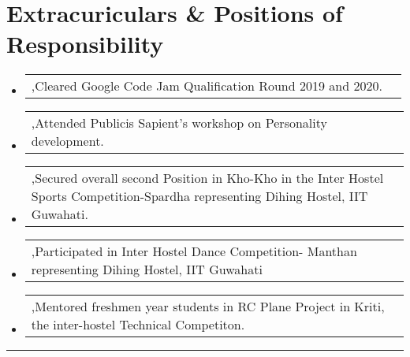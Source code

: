 \documentclass[a4paper,11pt]{article}
\makeatletter
\newcommand{\resumePOR}[3]{
\vspace{0.5mm}\item
    \begin{tabular*}{0.97\textwidth}[t]{l@{\extracolsep{\fill}}r}
        \textbf{#1},\hspace{0.3mm}#2 & \textit{\small{#3}} 
    \end{tabular*}
    \vspace{-2mm}
}
\newcommand{\resumeSubHeadingListStart}{\begin{itemize}[leftmargin=*,labelsep=0mm]}
\newcommand{\resumeSubHeadingListEnd}{\end{itemize}\vspace{2mm}}
\makeatother
\begin{document}
\section{Extracuriculars \& Positions of Responsibility}
\vspace{-0.4mm}
\resumeSubHeadingListStart
\resumePOR{} %
    {Cleared Google Code Jam Qualification Round 2019 and 2020.} %
    { } %
\resumePOR{} %
    {Attended Publicis Sapient's workshop on Personality development.} %
    { } %
\resumePOR{} %
    {Secured overall second Position in Kho-Kho in the Inter Hostel Sports Competition-Spardha representing Dihing Hostel, IIT Guwahati.} %
    { } %
\resumePOR{} %
    {Participated in Inter Hostel Dance Competition- Manthan representing Dihing Hostel, IIT Guwahati} %
    { } %
\resumePOR{} %
    {Mentored freshmen year students in RC Plane Project in Kriti, the inter-hostel Technical Competiton.} %
    { } %
\resumeSubHeadingListEnd
\vspace{-4mm}


\hspace*{-5mm}\rule{1.035\textwidth}{0.1mm}

\end{document}
